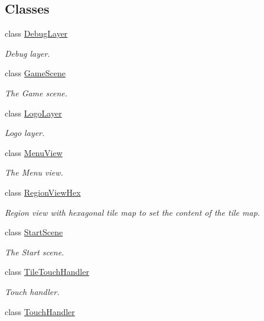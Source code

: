 \subsection*{Classes}
\begin{DoxyCompactItemize}
\item 
class \hyperlink{classClient_1_1Common_1_1Views_1_1DebugLayer}{Debug\+Layer}
\begin{DoxyCompactList}\small\item\em Debug layer. \end{DoxyCompactList}\item 
class \hyperlink{classClient_1_1Common_1_1Views_1_1GameScene}{Game\+Scene}
\begin{DoxyCompactList}\small\item\em The Game scene. \end{DoxyCompactList}\item 
class \hyperlink{classClient_1_1Common_1_1Views_1_1LogoLayer}{Logo\+Layer}
\begin{DoxyCompactList}\small\item\em Logo layer. \end{DoxyCompactList}\item 
class \hyperlink{classClient_1_1Common_1_1Views_1_1MenuView}{Menu\+View}
\begin{DoxyCompactList}\small\item\em The Menu view. \end{DoxyCompactList}\item 
class \hyperlink{classClient_1_1Common_1_1Views_1_1RegionViewHex}{Region\+View\+Hex}
\begin{DoxyCompactList}\small\item\em Region view with hexagonal tile map to set the content of the tile map. \end{DoxyCompactList}\item 
class \hyperlink{classClient_1_1Common_1_1Views_1_1StartScene}{Start\+Scene}
\begin{DoxyCompactList}\small\item\em The Start scene. \end{DoxyCompactList}\item 
class \hyperlink{classClient_1_1Common_1_1Views_1_1TileTouchHandler}{Tile\+Touch\+Handler}
\begin{DoxyCompactList}\small\item\em Touch handler. \end{DoxyCompactList}\item 
class \hyperlink{classClient_1_1Common_1_1Views_1_1TouchHandler}{Touch\+Handler}

\end{DoxyCompactItemize}
